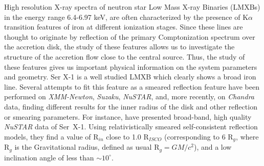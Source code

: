 \documentclass{aa}
\begin{document}
   \abstract
   {High resolution X-ray spectra of neutron star Low Mass X-ray Binaries 
(LMXBs) in the energy range 6.4-6.97 keV,
are often characterized by the presence of K$\alpha$ transition features of iron 
at different ionization stages. Since these lines are thought to originate by  
reflection of the primary Comptonization spectrum over the accretion disk, 
the study of these features allows us to investigate the structure of the 
accretion flow close to the central source.
Thus, the study of these features gives us important physical information 
on the system parameters and geometry.
Ser X-1 is a well studied LMXB which clearly shows a broad iron line.
Several attempts to fit this feature as a smeared reflection feature have
been performed on \emph{XMM-Newton}, \emph{Suzaku}, \emph{NuSTAR}, 
and, more recently, on  \emph{Chandra} data, %
finding different results for the inner radius of the disk
and other reflection or smearing parameters. 
For instance, \citet{Miller.etal:13} have presented broad-band, high quality 
\emph{NuSTAR} data of Ser~X-1. 
Using relativistically smeared self-consistent reflection models, 
they find a value of R$_{in}$ close to 1.0 R$_{ISCO}$ (corresponding to 6 R$_g$,
where R$_g$ is the Gravitational radius, defined as usual R$_g = G M / c^2$), and 
a low inclination angle of less than $\sim 10^\circ$.}
\end{document}
